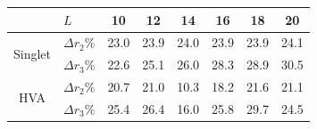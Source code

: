 \begin{tabular}{|c|l|c|c|c|c|c|c|}
\hline
 & $L$ & 10 & 12 & 14 & 16 & 18 & 20 \\
\hline
\multirow{2}{*}{Singlet} & $\Delta r_2 \%$ & 23.0 & 23.9 & 24.0 & 23.9 & 23.9 & 24.1 \\
\cline{2-8}
 & $\Delta r_3 \%$ & 22.6 & 25.1 & 26.0 & 28.3 & 28.9 & 30.5 \\
\hline
\multirow{2}{*}{HVA} & $\Delta r_2 \%$ & 20.7 & 21.0 & 10.3 & 18.2 & 21.6 & 21.1 \\
\cline{2-8}
 & $\Delta r_3 \%$ & 25.4 & 26.4 & 16.0 & 25.8 & 29.7 & 24.5 \\
\hline
\end{tabular}